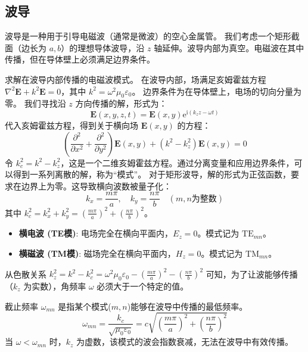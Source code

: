 \documentclass[fontset=none]{ctexart}
\begin{document}
\subsection{波导}
波导是一种用于引导电磁波（通常是微波）的空心金属管。
我们考虑一个矩形截面（边长为 $a, b$）的理想导体波导，沿 $z$ 轴延伸。波导内部为真空。电磁波在其中传播，但在导体壁上必须满足边界条件。
\begin{problem}[波导中的电磁波]
求解在波导内部传播的电磁波模式。
在波导内部，场满足亥姆霍兹方程 $\nabla^2 \bm{E} + k^2 \bm{E} = 0$，其中 $k^2=\omega^2\mu_0\varepsilon_0$。
边界条件为在导体壁上，电场的切向分量为零。
我们寻找沿 $z$ 方向传播的解，形式为：
\begin{equation}
\bm{E}(x,y,z,t) = \bm{E}(x,y) \mathrm{e}^{\mathrm{i}(k_z z - \omega t)}
\end{equation}
代入亥姆霍兹方程，得到关于横向场 $\bm{E}(x,y)$ 的方程：
\begin{equation}
\left(\frac{\partial^2}{\partial x^2} + \frac{\partial^2}{\partial y^2}\right) \bm{E}(x,y) + (k^2 - k_z^2)\bm{E}(x,y) = 0
\end{equation}
令 $k_c^2 = k^2 - k_z^2$，这是一个二维亥姆霍兹方程。通过分离变量和应用边界条件，可以得到一系列离散的解，称为“模式”。
对于矩形波导，解的形式为正弦函数，要求在边界上为零。这导致横向波数被量子化：
\begin{equation}
k_x = \frac{m\pi}{a}, \quad k_y = \frac{n\pi}{b} \quad (m, n \text{为整数})
\end{equation}
其中 $k_c^2 = k_x^2 + k_y^2 = (\frac{m\pi}{a})^2 + (\frac{n\pi}{b})^2$。
\end{problem}
\begin{definition}[波导模式]
\begin{itemize}
    \item \textbf{横电波 (TE模)}: 电场完全在横向平面内，$E_z = 0$。模式记为 $\mathrm{TE}_{mn}$。
    \item \textbf{横磁波 (TM模)}: 磁场完全在横向平面内，$H_z = 0$。模式记为 $\mathrm{TM}_{mn}$。
\end{itemize}
\end{definition}
从色散关系 $k_z^2 = k^2 - k_c^2 = \omega^2\mu_0\varepsilon_0 - \left(\frac{m\pi}{a}\right)^2 - \left(\frac{n\pi}{b}\right)^2$ 可知，为了让波能够传播（$k_z$ 为实数），角频率 $\omega$ 必须大于一个特定的值。
\begin{definition}[截止频率]
截止频率 $\omega_{mn}$ 是指某个模式($m,n$)能够在波导中传播的最低频率。
\begin{equation}
\omega_{mn} = \frac{k_c}{\sqrt{\mu_0\varepsilon_0}} = c\sqrt{\left(\frac{m\pi}{a}\right)^2 + \left(\frac{n\pi}{b}\right)^2}
\end{equation}
当 $\omega < \omega_{mn}$ 时，$k_z$ 为虚数，该模式的波会指数衰减，无法在波导中有效传播。
\end{definition}
\end{document}
